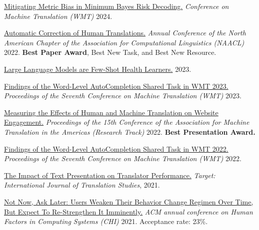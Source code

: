 \href{https://aclanthology.org/2024.wmt-1.109.pdf}{Mitigating Metric Bias in Minimum Bayes Risk Decoding.} \emph{Conference on Machine Translation (WMT)} 2024.

\href{https://aclanthology.org/2022.naacl-main.36.pdf}{Automatic Correction of Human Translations.} \emph{Annual Conference of the North American Chapter of the Association for Computational Linguistics (NAACL)} 2022. \textbf{Best Paper Award}, Best New Task, and Best New Resource. %

\href{https://arxiv.org/pdf/2305.15525}{Large Language Models are Few-Shot Health Learners.} 2023.

\href{https://aclanthology.org/2023.wmt-1.53.pdf}{Findings of the Word-Level AutoCompletion Shared Task in WMT 2023.} \emph{Proceedings of the Seventh Conference on Machine Translation (WMT)} 2023.

\href{https://aclanthology.org/2022.amta-research.23.pdf}{Measuring the Effects of Human and Machine Translation on Website Engagement.} \emph{Proceedings of the 15th Conference of the Association for Machine Translation in the Americas (Research Track)} 2022. \textbf{Best Presentation Award.}

\href{https://aclanthology.org/2022.wmt-1.75.pdf}{Findings of the Word-Level AutoCompletion Shared Task in WMT 2022.} \emph{Proceedings of the Seventh Conference on Machine Translation (WMT)} 2022.

\href{https://arxiv.org/pdf/2011.05978.pdf}{The Impact of Text Presentation on Translator Performance.} \emph{Target: International Journal of Translation Studies}, 2021.

\href{https://hci.stanford.edu/publications/2021/notnow/notnowasklater.pdf}{Not Now, Ask Later: Users Weaken Their Behavior Change Regimen Over Time, But Expect To Re-Strengthen It Imminently.} \emph{ACM annual conference on Human Factors in Computing Systems (CHI)} 2021. Acceptance rate: 23\%. %

